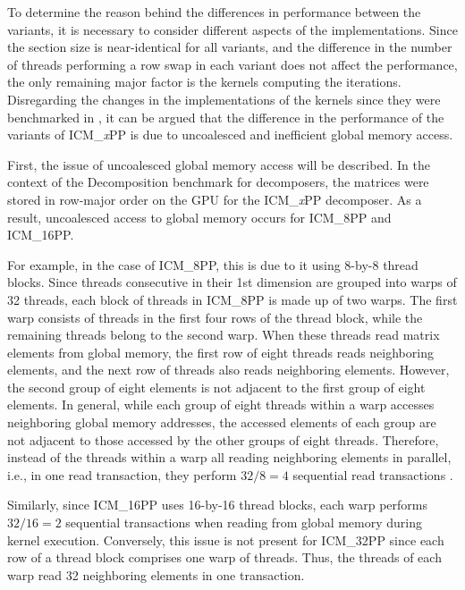 To determine the reason behind the differences in performance between the variants, it is necessary to consider different aspects of the implementations.
Since the section size is near-identical for all variants, and the difference in the number of threads performing a row swap in each variant does not affect the performance, the only remaining major factor is the kernels computing the iterations.\\
Disregarding the changes in the implementations of the kernels since they were benchmarked in  \cite{Cejka2022}, it can be argued that the difference in the performance of the variants of ICM\_\textit{x}PP is due to uncoalesced and inefficient global memory access.

First, the issue of uncoalesced global memory access will be described.
In the context of the Decomposition benchmark for decomposers, the matrices were stored in row-major order on the GPU for the ICM\_\textit{x}PP decomposer.
As a result, uncoalesced access to global memory occurs for ICM\_8PP and ICM\_16PP.

For example, in the case of ICM\_8PP, this is due to it using 8-by-8 thread blocks.
Since threads consecutive in their 1st dimension are grouped into warps of 32 threads, each block of threads in ICM\_8PP is made up of two warps.
The first warp consists of threads in the first four rows of the thread block, while the remaining threads belong to the second warp.
When these threads read matrix elements from global memory, the first row of eight threads reads neighboring elements, and the next row of threads also reads neighboring elements.
However, the second group of eight elements is not adjacent to the first group of eight elements.
In general, while each group of eight threads within a warp accesses neighboring global memory addresses, the accessed elements of each group are not adjacent to those accessed by the other groups of eight threads.
Therefore, instead of the threads within a warp all reading neighboring elements in parallel, i.e., in one read transaction, they perform $32/8 = 4$ sequential read transactions \cite{Cejka2022}.

Similarly, since ICM\_16PP uses 16-by-16 thread blocks, each warp performs $32/16 = 2$ sequential transactions when reading from global memory during kernel execution.
Conversely, this issue is not present for ICM\_32PP since each row of a thread block comprises one warp of threads.
Thus, the threads of each warp read 32 neighboring elements in one transaction.


